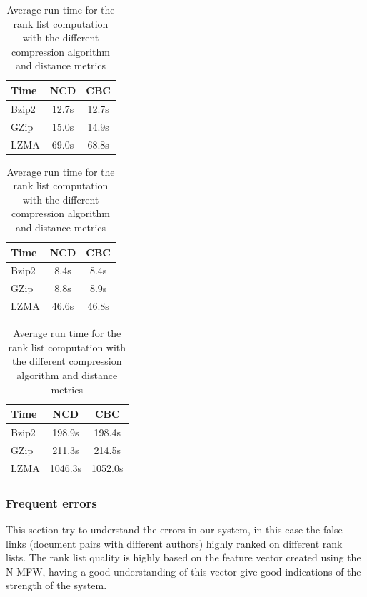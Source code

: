 \begin{table}
  \centering
  \label{tab:compression_evaluation_time}
  \caption{Average run time for the rank list computation with the different compression algorithm and distance metrics}

  \label{tab:compression_evaluation_time_oxquarry}
  \begin{tabular}{l c c}
    \toprule
    Time      & NCD   & CBC \\
    \midrule
    Bzip2     & 12.7s & 12.7s \\
    GZip      & 15.0s & 14.9s \\
    LZMA      & 69.0s & 68.8s \\
    \bottomrule
  \end{tabular}

  \label{tab:compression_evaluation_time_brunet}
  \begin{tabular}{l c c}
    \toprule
    Time      & NCD   & CBC \\
    \midrule
    Bzip2     & 8.4s & 8.4s \\
    GZip      & 8.8s & 8.9s \\
    LZMA      & 46.6s & 46.8s \\
    \bottomrule
  \end{tabular}

  \label{tab:compression_evaluation_time_st_jean}
  \begin{tabular}{l c c}
    \toprule
    Time      & NCD    & CBC \\
    \midrule
    Bzip2     & 198.9s  & 198.4s \\
    GZip      & 211.3s  & 214.5s \\
    LZMA      & 1046.3s & 1052.0s \\
    \bottomrule
  \end{tabular}
\end{table}


\subsubsection{Frequent errors}
\label{sec:frequent_errors}

This section try to understand the errors in our system, in this case the false links (document pairs with different authors) highly ranked on different rank lists.
The rank list quality is highly based on the feature vector created using the N-MFW, having a good understanding of this vector give good indications of the strength of the system.

